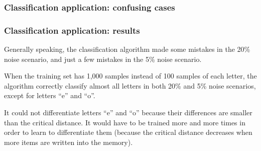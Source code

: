 \documentclass{beamer}
\begin{document}
\begin{frame}
\frametitle{Classification application: confusing cases}
\begin{figure}
  \centering


\end{figure}
\end{frame}


\begin{frame}
\frametitle{Classification application: results}
Generally speaking, the classification algorithm made some mistakes in the 20\% noise scenario, and just a few mistakes in the 5\% noise scenario.

When the training set has 1,000 samples instead of 100 samples of each letter, the algorithm correctly classify almost all letters in both 20\% and 5\% noise scenarios, except for letters ``e'' and ``o''.

It could not differentiate letters ``e'' and ``o'' because their differences are smaller than the critical distance. It would have to be trained more and more times in order to learn to differentiate them (because the critical distance decreases when more items are written into the memory).
\end{frame}
\end{document}
